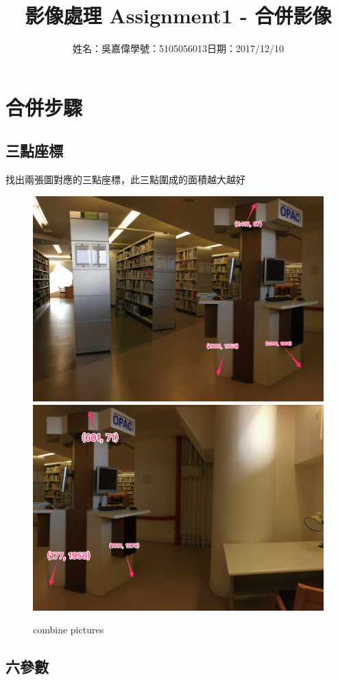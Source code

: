 \documentclass[12pt,a4paper]{article}
\title{\huge 影像處理 Assignment1 - 合併影像} %
\author{姓名：吳嘉偉\quad 學號：5105056013\quad 日期：2017/12/10} %
\date{} %
\begin{document}
\clearpage

\maketitle %

\section{合併步驟}

\subsection{三點座標}

{
\fontsize{14pt}{10pt} %
\selectfont %
找出兩張圖對應的三點座標，此三點圍成的面積越大越好
\begin{figure}[ht]
\centering
\includegraphics[width=.4\textwidth]{image/cor1.jpg}
\hspace{1cm}
\includegraphics[width=.4\textwidth]{image/cor2.jpg}
\caption{combine pictures}%
\label{要合併的兩張圖}%
\end{figure}
}

\newpage %
\subsection{六參數}
\end{document}
